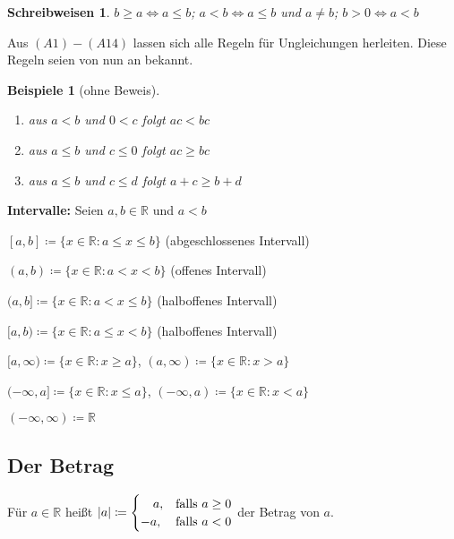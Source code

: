 \documentclass[titlepage,ngerman,a4paper,headsepline,DIV15,halfparskip*,14pt]{scrartcl}
\newcommand{\R}{\mathbb{R}}
\theoremstyle{dotless}
\newtheorem*{beispiele}{Beispiele}
\newtheorem*{schreibweisen}{Schreibweisen}
\begin{document}
\begin{schreibweisen}
$b \geq a \iff a \leq b$; $a < b \iff a \leq b$ und $a \neq b$; $b > 0 \iff a < b$
\end{schreibweisen}


Aus \hyperref[k.axiom]{$(A1) - (A14)$} lassen sich alle Regeln für Ungleichungen herleiten. Diese Regeln seien von nun an bekannt.


\begin{beispiele}[ohne Beweis]\
	\begin{enumerate}
		\item aus $a < b$ und $0 < c$ folgt $ac < bc$
		\item aus $a \leq b$ und $c \leq 0$ folgt $ac \geq bc$
		\item aus $a \leq b$ und $c \leq d$ folgt $a + c \geq b + d$
	\end{enumerate}
\end{beispiele}

\textbf{Intervalle:} Seien  $a, b \in \R$ und $a < b$
\begin{description}
	\item $[a, b] \coloneqq \{ x \in \R : a \leq x \leq b \}$ (abgeschlossenes Intervall) 
	\item $(a, b) \coloneqq \{ x \in \R : a < x < b \}$ (offenes Intervall)
	\item $(a, b] \coloneqq \{ x \in \R : a < x \leq b \}$ (halboffenes Intervall)
	\item $[a, b) \coloneqq \{ x \in \R : a \leq x < b \}$ (halboffenes Intervall)
	\item $[a, \infty) \coloneqq \{ x \in \R : x \geq a \}$, $(a , \infty) \coloneqq \{ x \in \R : x > a \}$
	\item $(-\infty, a] \coloneqq \{ x \in \R : x \leq a\}$, $(-\infty, a) \coloneqq \{ x \in \R : x < a\}$ 
	\item $(- \infty, \infty) \coloneqq \R$
\end{description}

\subsection*{Der Betrag} 
Für $a \in \R$ hei{\ss}t $|a| \coloneqq \begin{cases} \hspace{0.35cm} a, & \text{falls } a \geq 0 \\ -a, & \text{falls } a < 0\end{cases}$ der Betrag von $a$.
\end{document}
